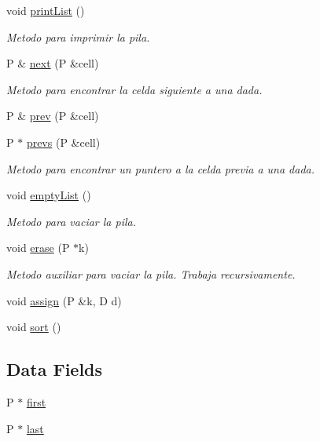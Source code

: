 \begin{DoxyCompactItemize}
void \hyperlink{classStack_a89b9967c15c83fe7c257a42e49725881}{print\+List} ()
\begin{DoxyCompactList}\small\item\em Metodo para imprimir la pila. \end{DoxyCompactList}\item 
P \& \hyperlink{classStack_aa86ccdcc6e57ade075de6ee51d1e5341}{next} (P \&cell)
\begin{DoxyCompactList}\small\item\em Metodo para encontrar la celda siguiente a una dada. \end{DoxyCompactList}\item 
P \& \hyperlink{classStack_a1e45de0c08c059313e99772c9e53820a}{prev} (P \&cell)
\item 
P $\ast$ \hyperlink{classStack_a0dfe15196e07fa8418a9f084db6b0173}{prevs} (P \&cell)
\begin{DoxyCompactList}\small\item\em Metodo para encontrar un puntero a la celda previa a una dada. \end{DoxyCompactList}\item 
void \hyperlink{classStack_a8d4119c8d4be2822f20a525743aa296e}{empty\+List} ()
\begin{DoxyCompactList}\small\item\em Metodo para vaciar la pila. \end{DoxyCompactList}\item 
void \hyperlink{classStack_ac2b9a59269d1ee3f593d42f81cf3a515}{erase} (P $\ast$k)
\begin{DoxyCompactList}\small\item\em Metodo auxiliar para vaciar la pila. Trabaja recursivamente. \end{DoxyCompactList}\item 
void \hyperlink{classStack_a8925b69439c6d583cf0a62f9a0cca026}{assign} (P \&k, D d)
\item 
void \hyperlink{classStack_a75261d2340f1f7b5e61b3770c0550982}{sort} ()
\end{DoxyCompactItemize}
\subsection*{Data Fields}
\begin{DoxyCompactItemize}
\item 
P $\ast$ \hyperlink{classStack_a072f08120143dbc8d868739fc24ae0b2}{first}
\item 
P $\ast$ \hyperlink{classStack_ac2caafb876777cbeb9306f9de407e00b}{last}
\end{DoxyCompactItemize}
